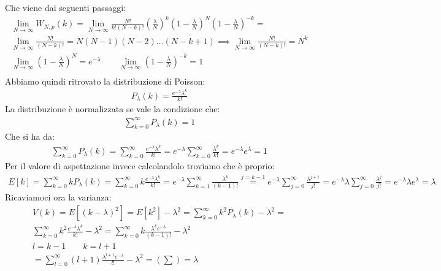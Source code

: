 \documentclass[a4paper, oneside]{article}
\begin{document}
Che viene dai seguenti passaggi:
\begin{gather*}
     \lim_{N \to \infty} W_{N,p}(k) = \lim_{N \to \infty} \frac{N!}{k!(N-k)!} \left( \frac{\lambda}{N} \right)^k \left( 1 - \frac{\lambda}{N} \right)^N \left( 1 - \frac{\lambda}{N} \right)^{-k} =\\
     \lim_{N \to \infty} \frac{N!}{(N-k)!} = N(N-1)(N-2)\dots(N-k+1) \implies \lim_{N \to \infty} \frac{N!}{(N-k)!} = N^k\\
     \lim_{N \to \infty} \left( 1 - \frac{\lambda}{N} \right)^N = e^{-\lambda} \qquad \lim_{N \to \infty} \left( 1 - \frac{\lambda}{N} \right)^{-k} = 1\\
\end{gather*}
Abbiamo quindi ritrovato la distribuzione di Poisson:
\begin{gather*}
    P_\lambda(k) = \frac{e^{-\lambda} \lambda^k}{k!}    
\end{gather*}
La distribuzione è normalizzata se vale la condizione che:
\begin{gather*}
    \sum_{k=0}^{\infty} P_\lambda(k) = 1 
\end{gather*}
Che si ha da:
\begin{gather*}
    \sum_{k=0}^{\infty} P_\lambda(k) = \sum_{k=0}^{\infty} \frac{e^{-\lambda} \lambda^k}{k!} = e^{-\lambda} \sum_{k=0}^{\infty} \frac{\lambda^k}{k!} = e^{-\lambda} e^{\lambda} = 1
\end{gather*}
Per il valore di aspettazione invece calcolandolo troviamo che è proprio:
\begin{gather*}
    E[k] = \sum_{k=0}^{\infty} k P_\lambda(k) = \sum_{k=0}^{\infty} k \frac{e^{-\lambda} \lambda^k}{k!} = e^{-\lambda} \sum_{k=1}^{\infty} \frac{\lambda^k}{(k-1)!} \overset{j = k-1}{=} e^{-\lambda} \sum_{j=0}^{\infty} \frac{\lambda^{j+1}}{j!} = e^{-\lambda} \lambda \sum_{j=0}^{\infty} \frac{\lambda^j}{j!} = e^{-\lambda} \lambda e^{\lambda} = \lambda
\end{gather*}
Ricaviamoci ora la varianza:
\begin{gather*}
    V(k) = E[(k-\lambda)^2] = E[k^2] - \lambda^2 = \sum_{k=0}^{\infty} k^2 P_\lambda(k) - \lambda^2 =\\ \sum_{k=0}^{\infty} k^2 \frac{e^{-\lambda} \lambda^k}{k!} - \lambda^2 = \sum_{k=0}^{\infty} k \frac{\lambda^k e^{-\lambda}}{(k-1)!} - \lambda^2\\
    l = k - 1 \qquad k = l + 1\\
    = \sum_{l = 0}^{\infty} (l+1) \frac{\lambda^{l+1} e^{-\lambda}}{l!} - \lambda^2 = \left( \sum \right) = \lambda
\end{gather*}
\end{document}
